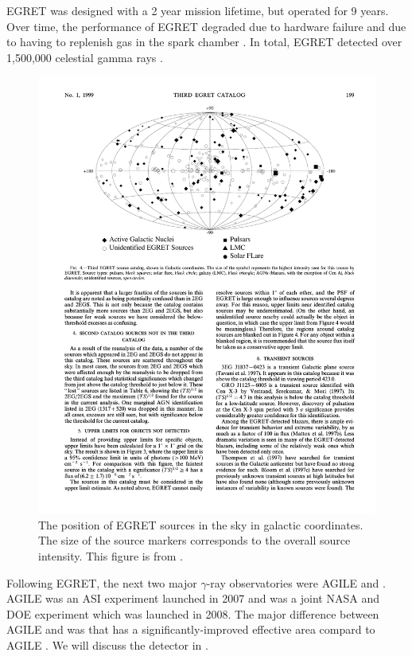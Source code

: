 \ac{EGRET} was designed with a 2 year mission lifetime, but operated for 9 years.
Over time, the performance of \ac{EGRET} degraded due to hardware failure
and due to having to replenish gas in the spark chamber \cite{esposito_1999a_in-flight-calibration}.
In total, \ac{EGRET} detected over 1,500,000 celestial gamma rays \citep{thompson_2008a_gamma-astrophysics:}.

\begin{figure}[htbp]
\centering
\includegraphics{chapters/introduction/figures/third_egret_catalog_sources.pdf}
\caption{The position of \ac{EGRET} sources in the sky in galactic
coordinates.  The size of the source markers corresponds to the overall
source intensity.  This figure is from \citep{hartman_1999a_third-egret}.}
\end{figure}

Following \ac{EGRET}, the next two major $\gamma$-ray observatories
were \ac{AGILE} \citep{pittori_2003a_gamma-ray-imaging}
and \fermi \citep{atwood_2009a_large-telescope}.
\ac{AGILE} was an \ac{ASI} experiment launched in 2007 and \fermi was a
joint \ac{NASA} and \ac{DOE} experiment which was launched in 2008.
The major difference between \ac{AGILE} and \fermi was that
\fermi has a significantly-improved effective area 
\citep[$9,500\unitspace\cm^2$,][]{atwood_2009a_large-telescope}
compard to \ac{AGILE} 
\citep[$\sim500\unitspace\cm^2$,][]{pittori_2003a_gamma-ray-imaging}.
We will discuss the \fermi detector in .
